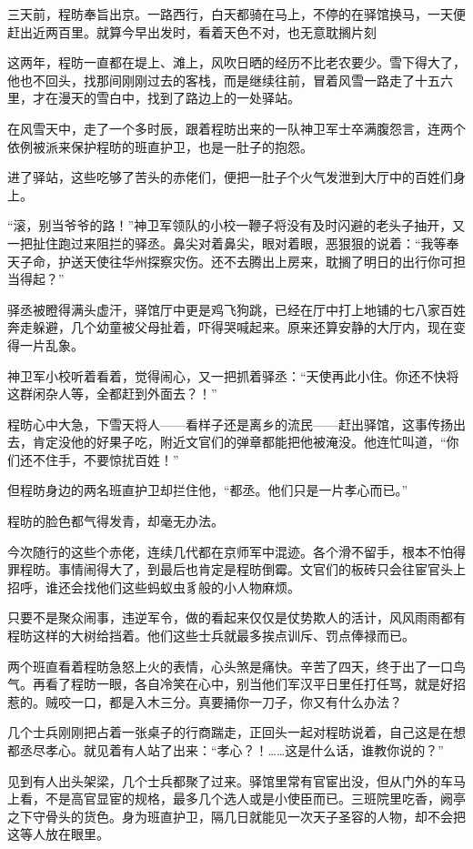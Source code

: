 三天前，程昉奉旨出京。一路西行，白天都骑在马上，不停的在驿馆换马，一天便赶出近两百里。就算今早出发时，看着天色不对，也无意耽搁片刻

这两年，程昉一直都在堤上、滩上，风吹日晒的经历不比老农要少。雪下得大了，他也不回头，找那间刚刚过去的客栈，而是继续往前，冒着风雪一路走了十五六里，才在漫天的雪白中，找到了路边上的一处驿站。

在风雪天中，走了一个多时辰，跟着程昉出来的一队神卫军士卒满腹怨言，连两个依例被派来保护程昉的班直护卫，也是一肚子的抱怨。

进了驿站，这些吃够了苦头的赤佬们，便把一肚子个火气发泄到大厅中的百姓们身上。

“滚，别当爷爷的路！”神卫军领队的小校一鞭子将没有及时闪避的老头子抽开，又一把扯住跑过来阻拦的驿丞。鼻尖对着鼻尖，眼对着眼，恶狠狠的说着：“我等奉天子命，护送天使往华州探察灾伤。还不去腾出上房来，耽搁了明日的出行你可担当得起？”

驿丞被瞪得满头虚汗，驿馆厅中更是鸡飞狗跳，已经在厅中打上地铺的七八家百姓奔走躲避，几个幼童被父母扯着，吓得哭喊起来。原来还算安静的大厅内，现在变得一片乱象。

神卫军小校听着看着，觉得闹心，又一把抓着驿丞：“天使再此小住。你还不快将这群闲杂人等，全都赶到外面去？！”

程昉心中大急，下雪天将人——看样子还是离乡的流民——赶出驿馆，这事传扬出去，肯定没他的好果子吃，附近文官们的弹章都能把他被淹没。他连忙叫道，“你们还不住手，不要惊扰百姓！”

但程昉身边的两名班直护卫却拦住他，“都丞。他们只是一片孝心而已。”

程昉的脸色都气得发青，却毫无办法。

今次随行的这些个赤佬，连续几代都在京师军中混迹。各个滑不留手，根本不怕得罪程昉。事情闹得大了，到最后也肯定是程昉倒霉。文官们的板砖只会往宦官头上招呼，谁还会找他们这些蚂蚁虫豸般的小人物麻烦。

只要不是聚众闹事，违逆军令，做的看起来仅仅是仗势欺人的活计，风风雨雨都有程昉这样的大树给挡着。他们这些士兵就最多挨点训斥、罚点俸禄而已。

两个班直看着程昉急怒上火的表情，心头煞是痛快。辛苦了四天，终于出了一口鸟气。再看了程昉一眼，各自冷笑在心中，别当他们军汉平日里任打任骂，就是好招惹的。贼咬一口，都是入木三分。真要捅你一刀子，你又有什么办法？

几个士兵刚刚把占着一张桌子的行商踹走，正回头一起对程昉说着，自己这是在想都丞尽孝心。就见着有人站了出来：“孝心？！……这是什么话，谁教你说的？”

见到有人出头架梁，几个士兵都聚了过来。驿馆里常有官宦出没，但从门外的车马上看，不是高官显宦的规格，最多几个选人或是小使臣而已。三班院里吃香，阙亭之下守骨头的货色。身为班直护卫，隔几日就能见一次天子圣容的人物，却不会把这等人放在眼里。

